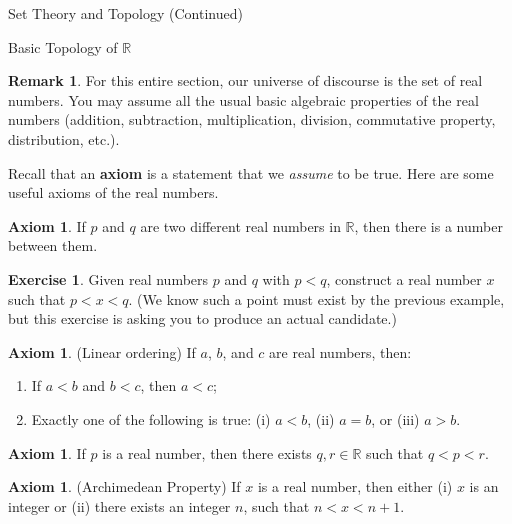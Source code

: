 \documentclass[11pt]{article}
\theoremstyle{definition}
\newtheorem{axiom}[theorem]{Axiom}
\newtheorem{exercise}[theorem]{Exercise}
\newtheorem{remark}[theorem]{Remark}
\begin{document}
\addtocounter{section}{1}

\begin{section}{Set Theory and Topology (Continued)}

\addtocounter{subsection}{3}
\addtocounter{theorem}{58}

\begin{subsection}{Basic Topology of $\mathbb{R}$}

\begin{remark}
For this entire section, our universe of discourse is the set of real numbers.  You may assume all the usual basic algebraic properties of the real numbers (addition, subtraction, multiplication, division, commutative property, distribution, etc.).
\end{remark}

Recall that an \textbf{axiom} is a statement that we \emph{assume} to be true.  Here are some useful axioms of the real numbers.

\begin{axiom} 
If $p$ and $q$ are two different real numbers in $\mathbb{R}$, then there is a number between them.
\end{axiom}

\begin{exercise}
Given real numbers $p$ and $q$ with $p<q$, construct a real number $x$ such that $p<x<q$.  (We know such a point must exist by the previous example, but this exercise is asking you to produce an actual candidate.)
\end{exercise}

\begin{axiom}
(Linear ordering) If $a$, $b$, and $c$ are real numbers, then:
\begin{enumerate}
\item If $a < b$ and $b<c$, then $a<c$;
\item Exactly one of the following is true: (i) $a < b$, (ii) $a=b$, or (iii) $a>b$.
\end{enumerate}
\end{axiom}

\begin{axiom}
If $p$ is a real number, then there exists $q,r\in\mathbb{R}$ such that $q<p<r$.
\end{axiom}

\begin{axiom}
(Archimedean Property) If $x$ is a real number, then either (i) $x$ is an integer or (ii) there exists an integer $n$, such that $n<x<n+1$. 
\end{axiom}


\end{subsection}
\end{section}
\end{document}
